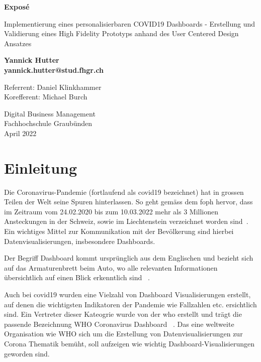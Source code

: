 \documentclass[12pt, oneside]{article}
\begin{document}
\begin{titlepage}
	\begin{center}
		\Huge
		\textbf{Exposé}
		
		\vspace{0.5cm}
		\LARGE
		Implementierung eines personalisierbaren COVID19 Dashboards - Erstellung und Validierung eines High Fidelity Prototyps anhand des User Centered Design Ansatzes
		
		\vspace{1.5cm}
		\normalsize
		\textbf{Yannick Hutter}\\
		\textbf{yannick.hutter@stud.fhgr.ch}
		
		\vfill
		Referrent: Daniel Klinkhammer\\
		Korefferent: Michael Burch\\
		
		\vspace{0.8cm}
		
		
		Digital Business Management\\
		Fachhochschule Graubünden\\
		April 2022
	\end{center}
\end{titlepage}



\tableofcontents
\listoffigures
\listoftables



\clearpage
{}
\setcounter{page}{2}

\section{Einleitung}
Die Coronavirus-Pandemie (fortlaufend als \Gls{covid19} bezeichnet) hat in grossen Teilen der Welt seine Spuren hinterlassen. So geht gemäss dem \Gls{foph} hervor, dass im Zeitraum vom 24.02.2020 bis zum 10.03.2022 mehr als 3 Millionen Ansteckungen in der Schweiz, sowie im Liechtenstein verzeichnet worden sind~\citep{covid19_laboratory_confirmed_cases}. Ein wichtiges Mittel zur Kommunikation mit der Bevölkerung sind hierbei Datenvisualisierungen, insbesondere Dashboards.

Der Begriff Dashboard kommt ursprünglich aus dem Englischen und bezieht sich auf das Armaturenbrett beim Auto, wo alle relevanten Informationen übersichtlich auf einen Blick erkenntlich sind ~\citep{dashboard_term_definition}.

Auch bei \Gls{covid19} wurden eine Vielzahl von Dashboard Visualisierungen erstellt, auf denen die wichtigsten Indikatoren der Pandemie wie Fallzahlen etc. ersichtlich sind. Ein Vertreter dieser Kateogrie wurde von der \Gls{who} erstellt und trägt die passende Bezeichnung WHO Coronavirus Dashboard ~\citep{who_dashboard}. Das eine weltweite Organisation wie WHO sich um die Erstellung von Datenvisualisierungen zur Corona Thematik bemüht, soll aufzeigen wie wichtig Dashboard-Visualisierungen geworden sind.
\end{document}
